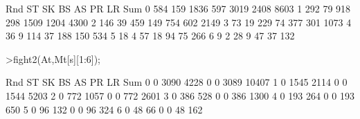 \documentclass[a4paper,10pt]{article}
\begin{document}
\begin{eulernotebook}
\begin{euleroutput}
       Rnd      ST      SK      BS      AS      PR      LR     Sum
         0     584     159    1836     597    3019    2408    8603
         1     292      79     918     298    1509    1204    4300
         2     146      39     459     149     754     602    2149
         3      73      19     229      74     377     301    1073
         4      36       9     114      37     188     150     534
         5      18       4      57      18      94      75     266
         6       9       2      28       9      47      37     132
\end{euleroutput}
\begin{eulerprompt}
>fight2(At,Mt[s][1:6]);
\end{eulerprompt}
\begin{euleroutput}
       Rnd      ST      SK      BS      AS      PR      LR     Sum
         0       0    3090    4228       0       0    3089   10407
         1       0    1545    2114       0       0    1544    5203
         2       0     772    1057       0       0     772    2601
         3       0     386     528       0       0     386    1300
         4       0     193     264       0       0     193     650
         5       0      96     132       0       0      96     324
         6       0      48      66       0       0      48     162
  

\end{euleroutput}
\end{eulernotebook}
\end{document}
